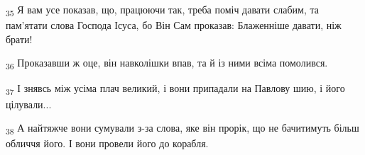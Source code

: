 \begin{tcolorbox}
\textsubscript{35} Я вам усе показав, що, працюючи так, треба поміч давати слабим, та пам'ятати слова Господа Ісуса, бо Він Сам проказав: Блаженніше давати, ніж брати!
\end{tcolorbox}
\begin{tcolorbox}
\textsubscript{36} Проказавши ж оце, він навколішки впав, та й із ними всіма помолився.
\end{tcolorbox}
\begin{tcolorbox}
\textsubscript{37} І знявсь між усіма плач великий, і вони припадали на Павлову шию, і його цілували...
\end{tcolorbox}
\begin{tcolorbox}
\textsubscript{38} А найтяжче вони сумували з-за слова, яке він прорік, що не бачитимуть більш обличчя його. І вони провели його до корабля.
\end{tcolorbox}
